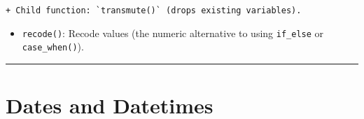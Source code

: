 \documentclass[
]{book}
\providecommand{\tightlist}{%
  \setlength{\itemsep}{0pt}\setlength{\parskip}{0pt}}
\begin{document}
\begin{verbatim}
+ Child function: `transmute()` (drops existing variables).
\end{verbatim}

\begin{itemize}
\tightlist
\item
  \texttt{recode()}: Recode values (the numeric alternative to using \texttt{if\_else} or \texttt{case\_when()}).
\end{itemize}

\begin{center}\rule{0.5\linewidth}{0.5pt}\end{center}

\hypertarget{dates-and-datetimes-1}{%
\section{Dates and Datetimes}\label{dates-and-datetimes-1}}
\end{document}
